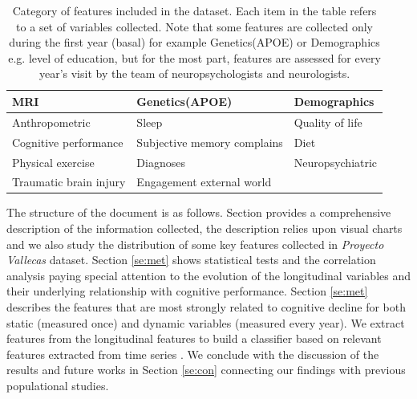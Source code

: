 \documentclass[11pt]{article}
\theoremstyle{definition}
\theoremstyle{remark}
\begin{document}
\begin{table}
\begin{tabular}{ |p{4cm}|p{4cm}|p{4cm}| }
\hline
\hline
MRI & Genetics(APOE) & Demographics  \\
\hline
Anthropometric & Sleep & Quality of life \\
\hline
Cognitive performance & Subjective memory complains & Diet \\
\hline
Physical exercise & Diagnoses & Neuropsychiatric \\
\hline
Traumatic brain injury & Engagement external world &  \\
\hline

\hline
\end{tabular}
\caption{\label{tab:tableclustervallecas} Category of features included in the dataset. Each item in the table refers to a set of variables collected. Note that some features are collected only during the first year (basal) for example Genetics(APOE) or Demographics e.g. level of education, but for the most part, features are assessed for every year's visit by the team of neuropsychologists and neurologists.}
\end{table}

The structure of the document is as follows. 
Section \cite{se:int} provides a comprehensive description of the information collected, the description relies upon visual charts and we also study the distribution of some key features collected in \emph{Proyecto Vallecas} dataset.
Section \ref{se:met} shows statistical tests and the correlation analysis paying special attention to the evolution of the longitudinal variables and their underlying relationship with cognitive performance. 
Section \ref{se:met} describes the features that are most strongly related to cognitive decline for both static (measured once) and dynamic variables (measured every year). We extract features from the longitudinal features to build a classifier based on relevant features extracted from time series \cite{christ2018time}. We conclude with the discussion of the results and future works in Section \ref{se:con} connecting our findings with previous populational studies.  


\end{document}
